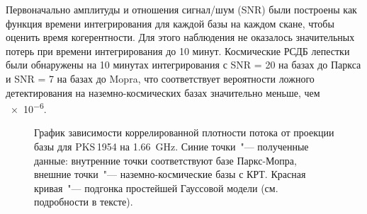 Первоначально амплитуды и отношения сигнал/шум (SNR) были построены как функция времени
интегрирования для каждой базы на каждом скане, чтобы оценить время когерентности. Для этого
наблюдения не оказалось значительных потерь при времени интегрирования до 10 минут. Космические РСДБ
лепестки были обнаружены на 10 минутах интегрирования с SNR = 20 на базах до Паркса и SNR = 7 на
базах до Mopra, что соответствует вероятности ложного детектирования на наземно-космических базах
значительно меньше, чем \num{e-6}.

\begin{figure}[tbh]
\caption{График зависимости коррелированной плотности потока от проекции базы для
PKS\,1954 на \SI{1.66}{\GHz}. Синие точки~"--- полученные данные: внутренние точки
соответствуют базе Паркс-Мопра, внешние точки~"--- наземно-космические базы с КРТ. Красная
кривая~"--- подгонка простейшей Гауссовой модели (см. подробности в тексте).}
\label{fig:pks_1954_radplot}
\end{figure}

